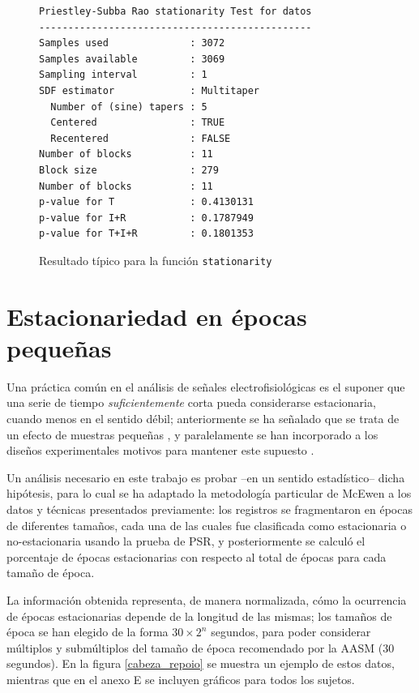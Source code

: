 \begin{figure}
\centering
\begin{lstlisting}[caption={}]
Priestley-Subba Rao stationarity Test for datos
-----------------------------------------------
Samples used              : 3072 
Samples available         : 3069 
Sampling interval         : 1 
SDF estimator             : Multitaper 
  Number of (sine) tapers : 5 
  Centered                : TRUE 
  Recentered              : FALSE 
Number of blocks          : 11 
Block size                : 279 
Number of blocks          : 11 
p-value for T             : 0.4130131 
p-value for I+R           : 0.1787949 
p-value for T+I+R         : 0.1801353 
\end{lstlisting}
\caption{Resultado típico para la función \texttt{stationarity}
}
\label{res_psr}
\end{figure}

\section{Estacionariedad en épocas pequeñas}

Una práctica común en el análisis de señales electrofisiológicas es el suponer que una serie de 
tiempo \textit{suficientemente} corta pueda considerarse estacionaria, cuando menos en el sentido
débil; anteriormente se ha señalado que se trata de un efecto de muestras pequeñas \cite{Melard89},
y paralelamente se han incorporado a los diseños experimentales motivos para mantener este supuesto
\cite{Kaiser00}.

Un análisis necesario en este trabajo es probar --en un sentido estadístico-- dicha hipótesis, para 
lo cual se ha adaptado la metodología particular de McEwen \cite{McEwen75} a los datos y técnicas 
presentados previamente: los registros se fragmentaron en épocas de diferentes tamaños, cada una de 
las cuales fue clasificada como estacionaria o no-estacionaria usando la prueba de PSR, y 
posteriormente se calculó el porcentaje de épocas estacionarias con respecto al total de épocas
para cada tamaño de época. 

La información obtenida representa, de manera normalizada, cómo la ocurrencia de épocas 
estacionarias depende de la longitud de las mismas; los tamaños de época se han elegido de la forma 
$30\times 2^{n}$ segundos, para poder considerar múltiplos y submúltiplos del tamaño de época
recomendado por la AASM (30 segundos).
En la figura \ref{cabeza_repoio} se muestra un ejemplo de estos datos, mientras que en el anexo E
se incluyen gráficos para todos los sujetos.


